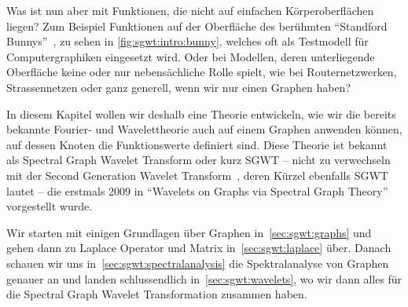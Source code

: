Was ist nun aber mit Funktionen, die nicht auf einfachen K\"orperoberfl\"achen 
liegen? Zum Beispiel Funktionen auf der Oberfl\"ache des ber\"uhmten 
``Standford Bunnys''~\cite{noauthor_stanford_nodate}, zu sehen in 
\cref{fig:sgwt:intro:bunny}, welches oft als Testmodell f\"ur Computergraphiken 
eingesetzt wird. Oder bei Modellen, deren unterliegende Oberfl\"ache keine oder 
nur nebens\"achliche Rolle spielt, wie bei Routernetzwerken, Strassennetzen 
oder ganz generell, wenn wir nur einen Graphen haben?

In diesem Kapitel wollen wir deshalb eine Theorie entwickeln, wie 
wir die bereits bekannte Fourier- und Wavelettheorie auch auf einem Graphen anwenden 
k\"onnen, auf dessen Knoten die Funktionswerte definiert sind. Diese Theorie 
ist bekannt als Spectral Graph Wavelet Transform oder kurz SGWT -- nicht zu 
verwechseln mit der Second Generation Wavelet 
Transform~\cite{noauthor_second-generation_2018}, deren K\"urzel ebenfalls SGWT 
lautet -- die erstmals 2009 in ``Wavelets on Graphs via Spectral Graph 
Theory''~\cite{hammond_wavelets_2009} vorgestellt wurde.

Wir starten mit einigen Grundlagen \"uber Graphen in~\cref{sec:sgwt:graphs} und 
gehen dann zu Laplace Operator und Matrix in~\cref{sec:sgwt:laplace} \"uber. 
Danach schauen wir uns in~\cref{sec:sgwt:spectralanalysis} die Spektralanalyse 
von Graphen genauer an und landen schlussendlich in~\cref{sec:sgwt:wavelets}, 
wo wir dann alles f\"ur die Spectral Graph Wavelet Transformation zusammen 
haben.
